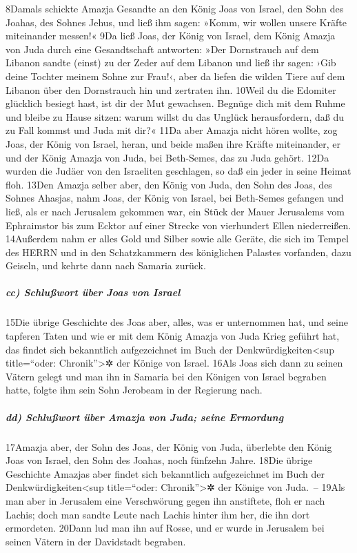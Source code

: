 8Damals schickte Amazja Gesandte an den König Joas von Israel, den Sohn
des Joahas, des Sohnes Jehus, und ließ ihm sagen: »Komm, wir wollen
unsere Kräfte miteinander messen!« 9Da ließ Joas, der König von Israel,
dem König Amazja von Juda durch eine Gesandtschaft antworten: »Der
Dornstrauch auf dem Libanon sandte (einst) zu der Zeder auf dem Libanon
und ließ ihr sagen: ›Gib deine Tochter meinem Sohne zur Frau!‹, aber da
liefen die wilden Tiere auf dem Libanon über den Dornstrauch hin und
zertraten ihn. 10Weil du die Edomiter glücklich besiegt hast, ist dir
der Mut gewachsen. Begnüge dich mit dem Ruhme und bleibe zu Hause
sitzen: warum willst du das Unglück herausfordern, daß du zu Fall kommst
und Juda mit dir?« 11Da aber Amazja nicht hören wollte, zog Joas, der
König von Israel, heran, und beide maßen ihre Kräfte miteinander, er und
der König Amazja von Juda, bei Beth-Semes, das zu Juda gehört. 12Da
wurden die Judäer von den Israeliten geschlagen, so daß ein jeder in
seine Heimat floh. 13Den Amazja selber aber, den König von Juda, den
Sohn des Joas, des Sohnes Ahasjas, nahm Joas, der König von Israel, bei
Beth-Semes gefangen und ließ, als er nach Jerusalem gekommen war, ein
Stück der Mauer Jerusalems vom Ephraimstor bis zum Ecktor auf einer
Strecke von vierhundert Ellen niederreißen. 14Außerdem nahm er alles
Gold und Silber sowie alle Geräte, die sich im Tempel des HERRN und in
den Schatzkammern des königlichen Palastes vorfanden, dazu Geiseln, und
kehrte dann nach Samaria zurück.

\hypertarget{cc-schluuxdfwort-uxfcber-joas-von-israel}{%
\subparagraph{cc) Schlußwort über Joas von
Israel}\label{cc-schluuxdfwort-uxfcber-joas-von-israel}}

15Die übrige Geschichte des Joas aber, alles, was er unternommen hat,
und seine tapferen Taten und wie er mit dem König Amazja von Juda Krieg
geführt hat, das findet sich bekanntlich aufgezeichnet im Buch der
Denkwürdigkeiten\textless sup title=``oder: Chronik''\textgreater✲ der
Könige von Israel. 16Als Joas sich dann zu seinen Vätern gelegt und man
ihn in Samaria bei den Königen von Israel begraben hatte, folgte ihm
sein Sohn Jerobeam in der Regierung nach.

\hypertarget{dd-schluuxdfwort-uxfcber-amazja-von-juda-seine-ermordung}{%
\subparagraph{dd) Schlußwort über Amazja von Juda; seine
Ermordung}\label{dd-schluuxdfwort-uxfcber-amazja-von-juda-seine-ermordung}}

17Amazja aber, der Sohn des Joas, der König von Juda, überlebte den
König Joas von Israel, den Sohn des Joahas, noch fünfzehn Jahre. 18Die
übrige Geschichte Amazjas aber findet sich bekanntlich aufgezeichnet im
Buch der Denkwürdigkeiten\textless sup title=``oder:
Chronik''\textgreater✲ der Könige von Juda.~-- 19Als man aber in
Jerusalem eine Verschwörung gegen ihn anstiftete, floh er nach Lachis;
doch man sandte Leute nach Lachis hinter ihm her, die ihn dort
ermordeten. 20Dann lud man ihn auf Rosse, und er wurde in Jerusalem bei
seinen Vätern in der Davidstadt begraben.

